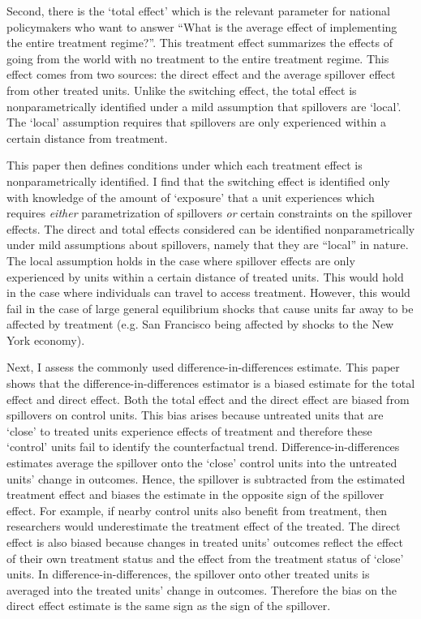 \documentclass[11pt]{article}
\begin{document}
Second, there is the `total effect' which is the relevant parameter for national policymakers who want to answer ``What is the average effect of implementing the entire treatment regime?''. This treatment effect summarizes the effects of going from the world with no treatment to the entire treatment regime. This effect comes from two sources: the direct effect and the average spillover effect from other treated units. Unlike the switching effect, the total effect is nonparametrically identified under a mild assumption that spillovers are `local'. The `local' assumption requires that spillovers are only experienced within a certain distance from treatment. 

This paper then defines conditions under which each treatment effect is nonparametrically identified. I find that the switching effect is identified only with knowledge of the amount of `exposure' that a unit experiences which requires \emph{either} parametrization of spillovers \emph{or} certain constraints on the spillover effects. The direct and total effects considered can be identified nonparametrically under mild assumptions about spillovers, namely that they are ``local'' in nature. The local assumption holds in the case where spillover effects are only experienced by units within a certain distance of treated units. This would hold in the case where individuals can travel to access treatment. However, this would fail in the case of large general equilibrium shocks that cause units far away to be affected by treatment (e.g. San Francisco being affected by shocks to the New York economy).

Next, I assess the commonly used difference-in-differences estimate. This paper shows that the difference-in-differences estimator is a biased estimate for the total effect and direct effect. Both the total effect and the direct effect are biased from spillovers on control units. This bias arises because untreated units that are `close' to treated units experience effects of treatment and therefore these `control' units fail to identify the counterfactual trend. Difference-in-differences estimates average the spillover onto the `close' control units into the untreated units' change in outcomes. Hence, the spillover is subtracted from the estimated treatment effect and biases the estimate in the opposite sign of the spillover effect. For example, if nearby control units also benefit from treatment, then researchers would underestimate the treatment effect of the treated. The direct effect is also biased because changes in treated units' outcomes reflect the effect of their own treatment status and the effect from the treatment status of `close' units. In difference-in-differences, the spillover onto other treated units is averaged into the treated units' change in outcomes. Therefore the bias on the direct effect estimate is the same sign as the sign of the spillover. 
\end{document}
